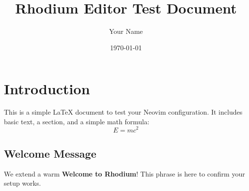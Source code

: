 \documentclass{article}
\title{Rhodium Editor Test Document}
\author{Your Name}
\date{\today}
\begin{document}
\maketitle

\section*{Introduction}
This is a simple \LaTeX{} document to test your Neovim configuration.
It includes basic text, a section, and a simple math formula:
\[ E = mc^2 \]

\subsection*{Welcome Message}
We extend a warm \textbf{Welcome to Rhodium}!
This phrase is here to confirm your setup works.
\end{document}
